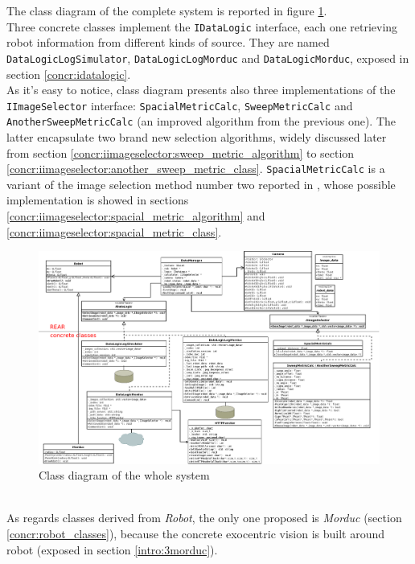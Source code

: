 The class diagram of the complete system is reported in figure
\ref{fig:class_diagram_complete}. 
\\
Three concrete classes implement the \texttt{IDataLogic} interface,
each one retrieving robot information from different kinds of source.
They are named \texttt{DataLogicLogSimulator}, \texttt{DataLogicLogMorduc}
and \texttt{DataLogicMorduc}, exposed in section \ref{concr:idatalogic}.
\\
As it's easy to notice, class diagram presents also three implementations 
of the \texttt{IImageSelector} interface: \texttt{SpacialMetricCalc},
\texttt{SweepMetricCalc} and \texttt{AnotherSweepMetricCalc}
(an improved algorithm from the previous one).
The latter encapsulate two brand new selection algorithms,
widely discussed later from section
\ref{concr:iimageselector:sweep_metric_algorithm} to section
\ref{concr:iimageselector:another_sweep_metric_class}.
\texttt{SpacialMetricCalc} is a variant 
of the image selection method number two reported in \cite{sugimoto}, 
whose possible implementation is showed in sections
\ref{concr:iimageselector:spacial_metric_algorithm} and
\ref{concr:iimageselector:spacial_metric_class}.
\begin{figure}[!h]
  \begin{center}
    \includegraphics[width=\textheight, angle=90]{img/class_diagram.png} 
    \caption{Class diagram of the whole system}
    \label{fig:class_diagram_complete}
  \end{center}
\end{figure}
\\
As regards classes derived from \textit{Robot}, the only one proposed
is \textit{Morduc} (section \ref{concr:robot_classes}), because
the concrete \framework{} exocentric vision
is built around \morduc{} robot (exposed in section \ref{intro:3morduc}).

\clearpage

\clearpage

\clearpage

